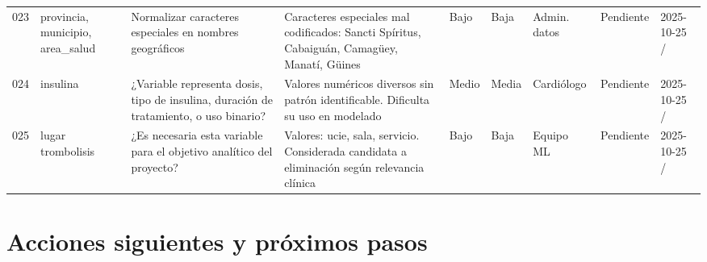 \documentclass[11pt,a4paper]{article}
\renewcommand{\arraystretch}{1.2}
\begin{document}
\begin{longtable}{@{}L{0.035\textwidth} L{0.10\textwidth} L{0.265\textwidth} L{0.17\textwidth} L{0.05\textwidth} L{0.05\textwidth} L{0.095\textwidth} L{0.065\textwidth} L{0.075\textwidth}@{}}
023 & provincia, municipio, area\_salud & Normalizar caracteres especiales en nombres geográficos & Caracteres especiales mal codificados: Sancti Sp\'iritus, Cabaigu\'an, Camag\"uey, Manat\'i, G\"uines & Bajo & Baja & Admin. datos & Pendiente & 2025-10-25 / \\
024 & insulina & ¿Variable representa dosis, tipo de insulina, duración de tratamiento, o uso binario? & Valores numéricos diversos sin patrón identificable. Dificulta su uso en modelado & Medio & Media & Cardiólogo & Pendiente & 2025-10-25 / \\
025 & lugar
trombolisis & ¿Es necesaria esta variable para el objetivo analítico del proyecto? & Valores: ucie, sala, servicio. Considerada candidata a eliminación según relevancia clínica & Bajo & Baja & Equipo ML & Pendiente & 2025-10-25 / \\
\end{longtable}
\renewcommand{\arraystretch}{1.2}
\normalsize


\section*{Acciones siguientes y próximos pasos}
\end{document}
